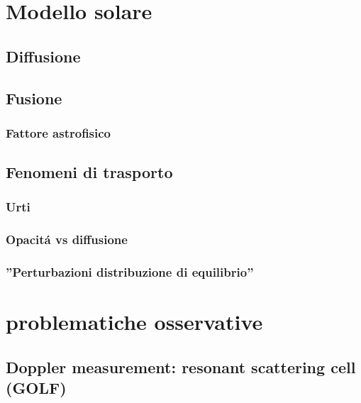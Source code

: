 \documentclass[../main.tex]{subfiles}
\begin{document}
\chapter{Modello solare}



\section{Diffusione}


\section{Fusione}

\subsection{Fattore astrofisico}

\section{Fenomeni di trasporto}

\begin{refsection}

\nocite{*}

\begingroup
\let\clearpage\relax
{}
\endgroup


\subsection{Urti}

\subsection{Opacit\'a vs diffusione}

\subsection{''Perturbazioni distribuzione di equilibrio''}


\end{refsection}


\chapter{problematiche osservative}

\section{Doppler measurement: resonant scattering cell (GOLF)}
\end{document}

